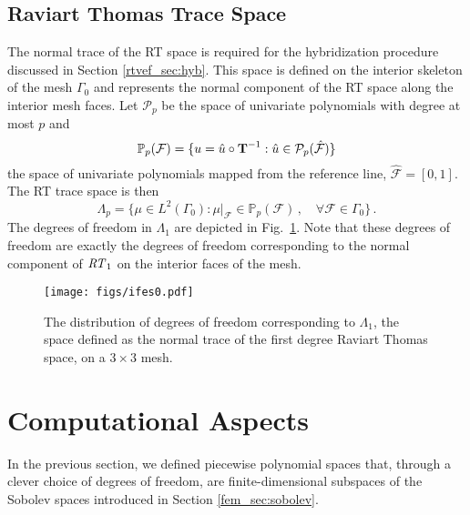 \documentclass[../doc.tex]{subfiles}
\begin{document}
\subsection{Raviart Thomas Trace Space}
The normal trace of the RT space is required for the hybridization procedure discussed in Section \ref{rtvef_sec:hyb}. This space is defined on the interior skeleton of the mesh $\Gamma_0$ and represents the normal component of the RT space along the interior mesh faces. Let $\mathcal{P}_p$ be the space of univariate polynomials with degree at most $p$ and 
	\begin{equation}
		\mathbb{P}_p(\mathcal{F}) = \{ u = \hat{u} \circ \boldsymbol{\mathrm{T}}^{-1} : \hat{u} \in \mathcal{P}_p(\hat{\mathcal{F}}) \}
	\end{equation}
the space of univariate polynomials mapped from the reference line, $\hat{\mathcal{F}} = [0,1]$. 
The RT trace space is then 
	\begin{equation}
		\Lambda_p = \{ \mu \in L^2(\Gamma_0) : \mu|_\mathcal{F} \in \mathbb{P}_p(\mathcal{F}) \,, \quad \forall \mathcal{F} \in \Gamma_0 \} \,. 
	\end{equation}
The degrees of freedom in $\Lambda_1$ are depicted in Fig.~\ref{fem:ifes}. Note that these degrees of freedom are exactly the degrees of freedom corresponding to the normal component of $\mathit{RT}_1$ on the interior faces of the mesh. 
\begin{figure}
\centering
\texttt{[image: figs/ifes0.pdf]}
\caption{The distribution of degrees of freedom corresponding to $\Lambda_1$, the space defined as the normal trace of the first degree Raviart Thomas space, on a $3\times 3$ mesh. }
\label{fem:ifes}
\end{figure}

\section{Computational Aspects}
In the previous section, we defined piecewise polynomial spaces that, through a clever choice of degrees of freedom, are finite-dimensional subspaces of the Sobolev spaces introduced in Section \ref{fem_sec:sobolev}. 
\end{document}
